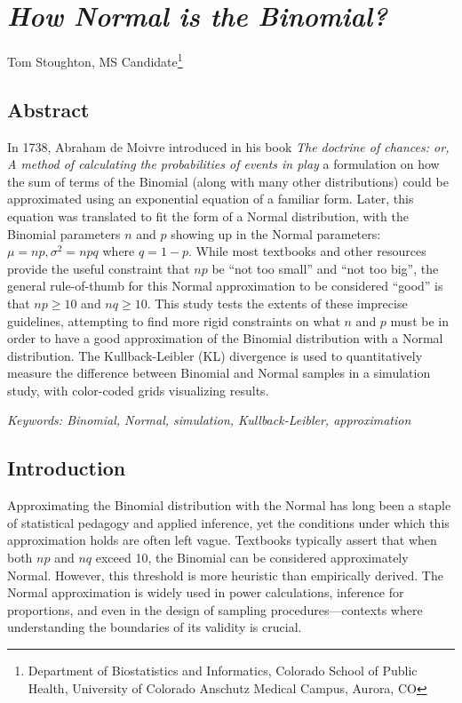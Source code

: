 \documentclass[
  twocolumn]{article}
\author{}
\date{\vspace{-2.5em}}
\begin{document}
\section{\texorpdfstring{\textit{How Normal is the Binomial?}}{}}\label{section}

Tom Stoughton, MS Candidate\footnote{Department of Biostatistics and Informatics, Colorado School of Public Health, University of Colorado Anschutz Medical Campus, Aurora, CO}

\subsection{Abstract}\label{abstract}

In 1738, Abraham de Moivre introduced in his book \emph{The doctrine of chances: or, A method of calculating the probabilities of events in play} a formulation on how the sum of terms of the Binomial (along with many other distributions) could be approximated using an exponential equation of a familiar form. Later, this equation was translated to fit the form of a Normal distribution, with the Binomial parameters \(n\) and \(p\) showing up in the Normal parameters: \(\mu = np, \sigma^2 = npq\) where \(q = 1-p\). While most textbooks and other resources provide the useful constraint that \(np\) be ``not too small'' and ``not too big'', the general rule-of-thumb for this Normal approximation to be considered ``good'' is that \(np \geq 10\) and \(nq \geq 10\). This study tests the extents of these imprecise guidelines, attempting to find more rigid constraints on what \(n\) and \(p\) must be in order to have a good approximation of the Binomial distribution with a Normal distribution. The Kullback-Leibler (KL) divergence is used to quantitatively measure the difference between Binomial and Normal samples in a simulation study, with color-coded grids visualizing results.

\emph{Keywords: Binomial, Normal, simulation, Kullback-Leibler, approximation}

\subsection{Introduction}\label{introduction}

Approximating the Binomial distribution with the Normal has long been a staple of statistical pedagogy and applied inference, yet the conditions under which this approximation holds are often left vague. Textbooks typically assert that when both \(np\) and \(nq\) exceed 10, the Binomial can be considered approximately Normal. However, this threshold is more heuristic than empirically derived. The Normal approximation is widely used in power calculations, inference for proportions, and even in the design of sampling procedures---contexts where understanding the boundaries of its validity is crucial.
\end{document}
